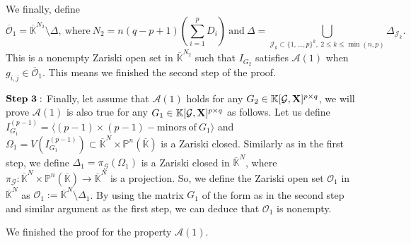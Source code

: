 \documentclass[11pt]{article}
\numberwithin{Property}{section}
\numberwithin{Theorem}{section}
\numberwithin{Proposition}{section}
\numberwithin{Lemma}{section}
\numberwithin{Corollary}{section}
\numberwithin{Definition}{section}
\numberwithin{Remark}{section}
\numberwithin{Conjecture}{section}
\numberwithin{Problem}{section}
\numberwithin{Claim}{section}
\theoremstyle{definition}
\numberwithin{Example}{section}
\renewcommand{\leq}{\leqslant}
\def\bar{\overline}
\newcommand{\field}{\mathbb{K}} %
\newcommand{\mat}[1]{\mathbf{\MakeUppercase{#1}}} %
\begin{document}
We finally, define \[\bar{\mathcal{O}}_1 = \bar{\field}^{N_2} \setminus \Delta, \ \mathrm{where}\  N_2 = n(q-p+1)(\sum_{i=1}^pD_i) \ \mathrm{and} \ \Delta = \bigcup_{\mathcal{J}_k \subset\{1, \ldots, p\}^k, \ 2 \leq k \leq \min(n,p)}\Delta_{\mathcal{J}_k}.\]
This is a nonempty Zariski open set in $\bar{\field}^{N_2}$ such that $I_{G_2}$ satisfies $\mathcal{A}(1)$ when $g_{i,j} \in \bar{\mathcal{O}}_1$. This means we finished the second step of the proof. 

$\bf{Step \ 3:}$ Finally, let assume that $\mathcal{A}(1)$ holds for any $G_2 \in \field[\mathcal{G}, \mat{X}]^{p \times q}$, we will prove $\mathcal{A}(1)$ is also true for any $G_1 \in \field[\mathcal{G}, \mat{X}]^{p \times q}$ as follows. Let us define $I_{G_1}^{(p-1)} = \langle (p-1) \times (p-1) - \mathrm{minors \ of} \ G_1 \rangle$ and $\Omega_1 = V(I_{G_1}^{(p-1)}) \subset \bar{\field}^{N} \times \mathbb{P}^n(\bar{\field})$ is a Zariski closed. Similarly as in the first step, we define $\Delta_1 = \pi_{\mathcal{G}}(\Omega_1)$ is a Zariski closed in $\bar{\field}^{N}$, where $\pi_{\mathcal{G}} : \bar{\field}^{N} \times \mathbb{P}^n(\bar{\field}) \to \bar{\field}^{N}$ is a projection. So, we define the Zariski open set $\mathcal{O}_1$ in $\bar{\field}^{N}$ as $\mathcal{O}_1 := \bar{\field}^{N} \setminus \Delta_1$. By using the matrix $G_1$ of the form as in the second step and similar argument as the first step, we can deduce that $\mathcal{O}_1$ is nonempty. 

We finished the proof for the property $\mathcal{A}(1)$. 
\end{document}
